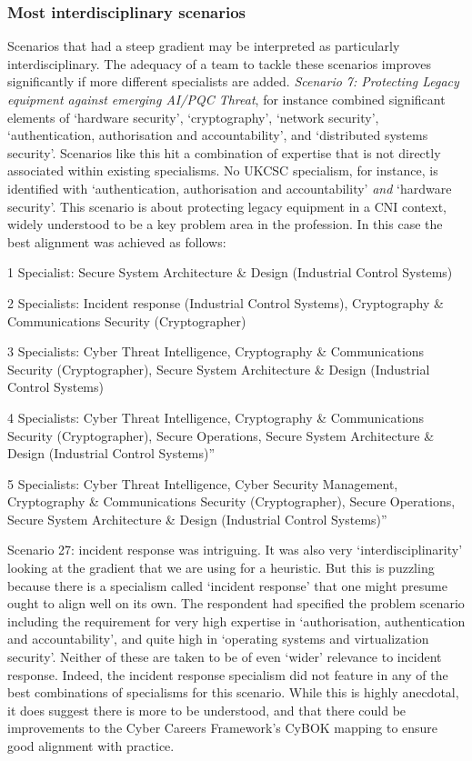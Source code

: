 \documentclass[
  a4paper,
]{book}
\begin{document}
\subsubsection{Most interdisciplinary
scenarios}\label{most-interdisciplinary-scenarios}

Scenarios that had a steep gradient may be interpreted as particularly
interdisciplinary. The adequacy of a team to tackle these scenarios
improves significantly if more different specialists are added.
\emph{Scenario 7: Protecting Legacy equipment against emerging AI/PQC
Threat}, for instance combined significant elements of `hardware
security', `cryptography', `network security', `authentication,
authorisation and accountability', and `distributed systems security'.
Scenarios like this hit a combination of expertise that is not directly
associated within existing specialisms. No UKCSC specialism, for
instance, is identified with `authentication, authorisation and
accountability' \emph{and} `hardware security'. This scenario is about
protecting legacy equipment in a CNI context, widely understood to be a
key problem area in the profession. In this case the best alignment was
achieved as follows:

1 Specialist: Secure System Architecture \& Design (Industrial Control
Systems)

2 Specialists: Incident response (Industrial Control Systems),
Cryptography \& Communications Security (Cryptographer)

3 Specialists: Cyber Threat Intelligence, Cryptography \& Communications
Security (Cryptographer), Secure System Architecture \& Design
(Industrial Control Systems)

4 Specialists: Cyber Threat Intelligence, Cryptography \& Communications
Security (Cryptographer), Secure Operations, Secure System Architecture
\& Design (Industrial Control Systems)''

5 Specialists: Cyber Threat Intelligence, Cyber Security Management,
Cryptography \& Communications Security (Cryptographer), Secure
Operations, Secure System Architecture \& Design (Industrial Control
Systems)''

Scenario 27: incident response was intriguing. It was also very
`interdisciplinarity' looking at the gradient that we are using for a
heuristic. But this is puzzling because there is a specialism called
`incident response' that one might presume ought to align well on its
own. The respondent had specified the problem scenario including the
requirement for very high expertise in `authorisation, authentication
and accountability', and quite high in `operating systems and
virtualization security'. Neither of these are taken to be of even
`wider' relevance to incident response. Indeed, the incident response
specialism did not feature in any of the best combinations of
specialisms for this scenario. While this is highly anecdotal, it does
suggest there is more to be understood, and that there could be
improvements to the Cyber Careers Framework's CyBOK mapping to ensure
good alignment with practice.
\end{document}

